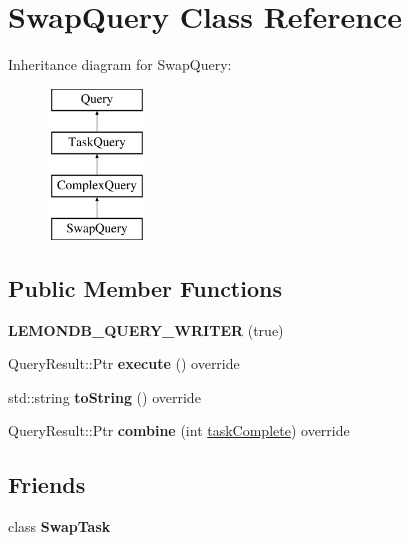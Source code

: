 \hypertarget{class_swap_query}{}\section{Swap\+Query Class Reference}
\label{class_swap_query}
Inheritance diagram for Swap\+Query\+:\begin{figure}[H]
\begin{center}
\leavevmode
\includegraphics[height=4.000000cm]{class_swap_query}
\end{center}
\end{figure}
\subsection*{Public Member Functions}
\begin{DoxyCompactItemize}
\item 
\mbox{\label{class_swap_query_a7742c2e9fd7ce6fb450ac6e2b770ee64}} 
{\bfseries L\+E\+M\+O\+N\+D\+B\+\_\+\+Q\+U\+E\+R\+Y\+\_\+\+W\+R\+I\+T\+ER} (true)
\item 
\mbox{\label{class_swap_query_a70d41991d7e02d471adedc8d008e7725}} 
Query\+Result\+::\+Ptr {\bfseries execute} () override
\item 
\mbox{\label{class_swap_query_a2b125ce89dbc801b0167c045c8c25494}} 
std\+::string {\bfseries to\+String} () override
\item 
\mbox{\label{class_swap_query_ae5131a8e6174ba815e2fac18fecae0f3}} 
Query\+Result\+::\+Ptr {\bfseries combine} (int \hyperlink{class_task_query_a3dc3e4c56ddea8ff025239fd9da358d3}{task\+Complete}) override
\end{DoxyCompactItemize}
\subsection*{Friends}
\begin{DoxyCompactItemize}
\item 
\mbox{\label{class_swap_query_a1645be9f6c26c9fe1dfa5eaa6a2f98df}} 
class {\bfseries Swap\+Task}
\end{DoxyCompactItemize}
